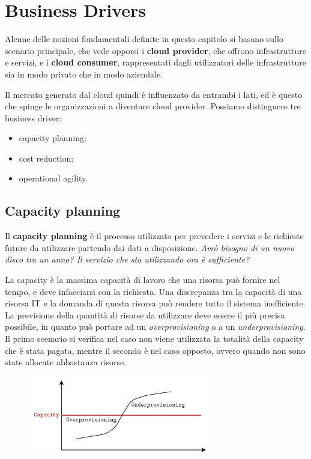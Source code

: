 \section{Business Drivers}
Alcune delle nozioni fondamentali definite in questo capitolo si basano sullo scenario principale, che vede opporsi i \textbf{cloud provider}, che offrono infrastrutture e servizi, e i \textbf{cloud consumer}, rappresentati dagli utilizzatori delle infrastrutture sia in modo privato che in modo aziendale.

Il mercato generato dal cloud quindi è influenzato da entrambi i lati, ed è questo che spinge le organizzazioni a diventare cloud provider.
Possiamo distinguere tre business driver:
\begin{itemize}
    \item capacity planning;
    \item cost reduction;
    \item operational agility.
\end{itemize}

\break
\subsection{Capacity planning}
Il \textbf{capacity planning} è il processo utilizzato per prevedere i servizi e le richieste future da utilizzare partendo dai dati a disposizione. \textit{Avrò bisogno di un nuovo disco tra un anno? Il servizio che sto utilizzando ora è sufficiente?}

La capacity è la massima capacità di lavoro che una risorsa può fornire nel tempo, e deve infacciarsi con la richiesta. Una discrepanza tra la capacità di una risorsa IT e la domanda di questa risorsa può rendere tutto il sistema inefficiente. La previsione della quantità di risorse da utilizzare deve essere il più precisa possibile, in quanto può portare ad un \textit{overprovisioning} o a un \textit{underprovisioning}.
Il primo scenario si verifica nel caso non viene utilizzata la totalità della capacity che è stata pagata, mentre il secondo è nel caso opposto, ovvero quando non sono state allocate abbastanza risorse.


\begin{figure}[ht]
    \centering
    \includegraphics[width=8cm]{./Images/cap2/2.2.png}
    \label{fig:image2.2}
\end{figure}


